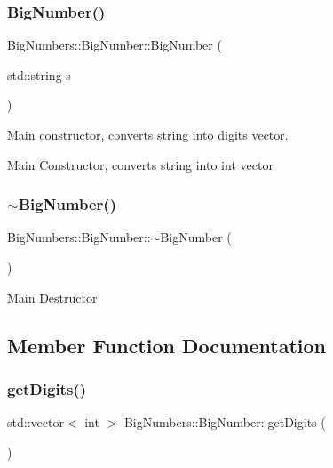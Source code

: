 \subsubsection{\texorpdfstring{BigNumber()}{BigNumber()}\hspace{0.1cm}{\footnotesize\ttfamily [2/2]}}
{\footnotesize\ttfamily Big\+Numbers\+::\+Big\+Number\+::\+Big\+Number (\begin{DoxyParamCaption}\item[{std\+::string}]{s }\end{DoxyParamCaption})}



Main constructor, converts string into digits vector. 

Main Constructor, converts string into int vector \mbox{\label{class_big_numbers_1_1_big_number_a9e8e8cc609eb94cdd523064d220753ec}} 
\subsubsection{\texorpdfstring{$\sim$BigNumber()}{~BigNumber()}}
{\footnotesize\ttfamily Big\+Numbers\+::\+Big\+Number\+::$\sim$\+Big\+Number (\begin{DoxyParamCaption}{ }\end{DoxyParamCaption})}

Main Destructor 

\subsection{Member Function Documentation}
\mbox{\label{class_big_numbers_1_1_big_number_af54ae86c6d3cdb2591c3afa39af0a910}} 
\subsubsection{\texorpdfstring{getDigits()}{getDigits()}}
{\footnotesize\ttfamily std\+::vector$<$ int $>$ Big\+Numbers\+::\+Big\+Number\+::get\+Digits (\begin{DoxyParamCaption}{ }\end{DoxyParamCaption})}




